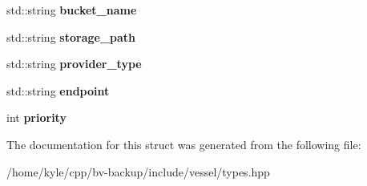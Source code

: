 \begin{DoxyCompactItemize}
\item 
\mbox{\label{struct_vessel_1_1_types_1_1_storage_provider_acf67fc655f9485b6f0487829688e5167}} 
std\+::string {\bfseries bucket\+\_\+name}
\item 
\mbox{\label{struct_vessel_1_1_types_1_1_storage_provider_a50be99e6a3632625c7dc4cc0d82e52ca}} 
std\+::string {\bfseries storage\+\_\+path}
\item 
\mbox{\label{struct_vessel_1_1_types_1_1_storage_provider_a5f78989282a78c14ebc8ebe2797725fd}} 
std\+::string {\bfseries provider\+\_\+type}
\item 
\mbox{\label{struct_vessel_1_1_types_1_1_storage_provider_ac608757c8fa426fb6b4513b020d56fe9}} 
std\+::string {\bfseries endpoint}
\item 
\mbox{\label{struct_vessel_1_1_types_1_1_storage_provider_a7e2918a97a10cf38f09126a7f70598e9}} 
int {\bfseries priority}
\end{DoxyCompactItemize}


The documentation for this struct was generated from the following file\+:\begin{DoxyCompactItemize}
\item 
/home/kyle/cpp/bv-\/backup/include/vessel/types.\+hpp\end{DoxyCompactItemize}
